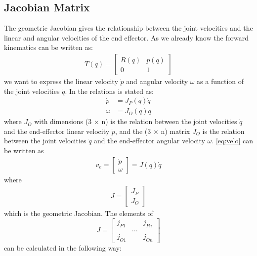 \subsection{Jacobian Matrix}
The geometric Jacobian gives the relationship between the joint velocities and the linear and angular velocities of the end effector\cite{Siciliano}\cite{spong}. As we already know the forward kinematics can be written as:
\begin{align*}
    T(q) = 
    \begin{bmatrix}
        R(q) & p(q)\\
        0 & 1
    \end{bmatrix}
\end{align*}
we want to express the linear velocity $\dot{p}$ and angular velocity $\omega$ as a function of the joint velocities $\dot{q}$. In \cite{Siciliano} the relations is stated as:
\begin{equation}
    \begin{aligned}\label{eq:velo}
        \dot{p} &= J_P(q)\dot{q}\\
        \omega&= J_O(q)\dot{q}
    \end{aligned}
\end{equation}
where $J_O$ with dimensions (3 $\times$ n) is the relation between the joint velocities $\dot{q}$ and the end-effector linear velocity $\dot{p}$, and the (3 $\times$ n) matrix $J_O$ is the relation between the joint velocities $\dot{q}$ and the end-effector angular velocity $\omega$. \eqref{eq:velo} can be written as
\begin{align*}
    v_e = 
    \begin{bmatrix}
        \dot{p} \\ \omega
    \end{bmatrix}
    = J(q)\dot{q}
\end{align*}
where
\begin{align*}
    J = 
    \begin{bmatrix}
        J_P \\ J_O
    \end{bmatrix}
\end{align*}
which is the geometric Jacobian. The elements of 
$$
J = 
\begin{bmatrix}
    j_{P1} & & j_{Pn}\\
    &...&\\
    j_{O1} & & j_{On}
\end{bmatrix}
$$
can be calculated in the following way:
